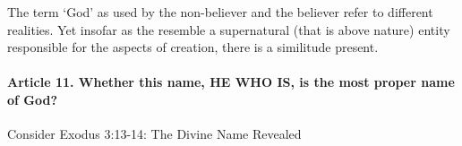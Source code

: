 \documentclass{ucetd}
\begin{document}
The term `God' as used by the non-believer and the believer refer to different realities. Yet insofar as the resemble a supernatural (that is above nature) entity responsible for the aspects of creation, there is a similitude present.

\paragraph{Article 11. Whether this name, HE WHO IS, is the most proper name of God?}
Consider Exodus 3:13-14:
The Divine Name Revealed
\end{document}
